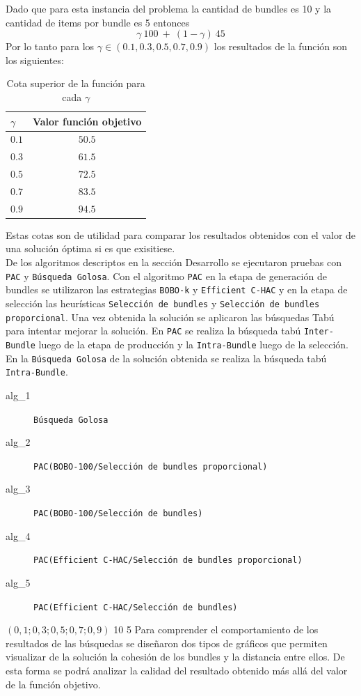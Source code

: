Dado que para esta instancia del problema la cantidad de bundles es 10 y la cantidad de items por bundle es 5 entonces  $$\displaystyle\gamma\ 100\ +\ (1-\gamma)\ 45$$
Por lo tanto para los $\gamma \in (0.1, 0.3, 0.5, 0.7, 0.9)$ los resultados de la función son los siguientes:\\
\begin{table}[H]
  \centering
  \resizebox{0.5\textwidth}{!} {
    \begin{tabular}{|lc|}
    \hline
    $\gamma$ & Valor función objetivo \\
    \hline
    $0.1$  & $50.5$ \\
    $0.3$  & $61.5$ \\
    $0.5$  & $72.5$ \\
    $0.7$  & $83.5$ \\
    $0.9$  & $94.5$ \\
    \hline
    \end{tabular}
  }
    \caption {Cota superior de la función para cada $\gamma$}
\end{table}
Estas cotas son de utilidad para comparar los resultados obtenidos con el valor de una solución óptima si es que exisitiese.\\

De los algoritmos descriptos en la sección Desarrollo se ejecutaron pruebas con \texttt{PAC} y \texttt{Búsqueda Golosa}. Con el algoritmo \texttt{PAC} en la etapa de generación de bundles se utilizaron las estrategias \texttt{BOBO-k} y \texttt{Efficient C-HAC} y en la etapa de selección las heurísticas \texttt{Selección de bundles} y \texttt{Selección de bundles proporcional}. Una vez obtenida la solución se aplicaron las búsquedas Tabú para intentar mejorar la solución. En \texttt{PAC} se realiza la búsqueda tabú \texttt{Inter-Bundle} luego de la etapa de producción y la \texttt{Intra-Bundle} luego de la selección. En la \texttt{Búsqueda Golosa} de la solución obtenida se realiza la búsqueda tabú \texttt{Intra-Bundle}.\\

\Solucion
{}
{
\begin{description}
	\item[alg\_1] \texttt{Búsqueda Golosa}
	\item[alg\_2] \texttt{PAC(BOBO-100/Selección de bundles proporcional)}
	\item[alg\_3] \texttt{PAC(BOBO-100/Selección de bundles)}
	\item[alg\_4] \texttt{PAC(Efficient C-HAC/Selección de bundles proporcional)}
	\item[alg\_5] \texttt{PAC(Efficient C-HAC/Selección de bundles)}
\end{description}
}
{$(0,1; 0,3; 0,5; 0,7; 0,9)$}
{10}
{5}
Para comprender el comportamiento de los resultados de las búsquedas se diseñaron dos tipos de gráficos que permiten visualizar de la solución la cohesión de los bundles y la distancia entre ellos. De esta forma se podrá analizar la calidad del resultado obtenido más allá del valor de la función objetivo.\\

